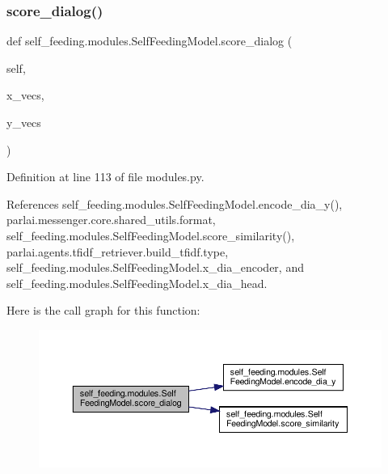 \mbox{\label{classself__feeding_1_1modules_1_1SelfFeedingModel_a48355f310914844e39040c4c67156c09}} 
\subsubsection{\texorpdfstring{score\+\_\+dialog()}{score\_dialog()}}
{\footnotesize\ttfamily def self\+\_\+feeding.\+modules.\+Self\+Feeding\+Model.\+score\+\_\+dialog (\begin{DoxyParamCaption}\item[{}]{self,  }\item[{}]{x\+\_\+vecs,  }\item[{}]{y\+\_\+vecs }\end{DoxyParamCaption})}



Definition at line 113 of file modules.\+py.



References self\+\_\+feeding.\+modules.\+Self\+Feeding\+Model.\+encode\+\_\+dia\+\_\+y(), parlai.\+messenger.\+core.\+shared\+\_\+utils.\+format, self\+\_\+feeding.\+modules.\+Self\+Feeding\+Model.\+score\+\_\+similarity(), parlai.\+agents.\+tfidf\+\_\+retriever.\+build\+\_\+tfidf.\+type, self\+\_\+feeding.\+modules.\+Self\+Feeding\+Model.\+x\+\_\+dia\+\_\+encoder, and self\+\_\+feeding.\+modules.\+Self\+Feeding\+Model.\+x\+\_\+dia\+\_\+head.

Here is the call graph for this function\+:
\nopagebreak
\begin{figure}[H]
\begin{center}
\leavevmode
\includegraphics[width=350pt]{classself__feeding_1_1modules_1_1SelfFeedingModel_a48355f310914844e39040c4c67156c09_cgraph}
\end{center}
\end{figure}
\mbox{\label{classself__feeding_1_1modules_1_1SelfFeedingModel_a0cd21631fce3dbc552b7006bd25c7edb}} 

